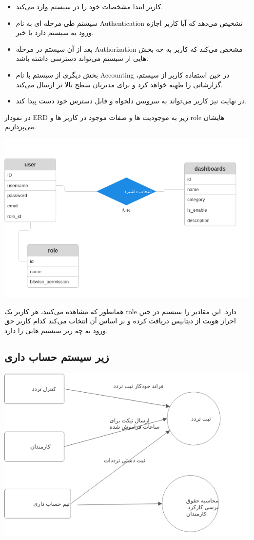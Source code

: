 \begin{itemize}
	\item کاربر ابتدا مشخصات خود را در سیستم وارد می‌کند.
	\item سیستم طی مرحله ای به نام Authentication تشخیص می‌دهد که آیا کاربر اجازه ورود به سیستم دارد یا خیر.
	\item بعد از آن سیستم در مرحله Authorization مشخص می‌کند که کاربر به چه بخش هایی از سیستم می‌تواند دسترسی داشته باشد.
	\item بخش دیگری از سیستم با نام Accounting در حین استفاده کاربر از سیستم، گزارشاتی را طهیه خواهد کرد و برای مدیریان سطح بالا تر ارسال می‌کند.
	\item در نهایت نیز کاربر می‌تواند به سرویس دلخواه و قابل دسترس خود دست پیدا کند.
\end{itemize}

در نمودار ERD زیر به موجودیت ها و صفات موجود در کاربر ها و role هایشان می‌پردازیم.

\includegraphics[scale=0.8]{assets/auth_erd.png}

همانطور که مشاهده می‌کنید، هر کاربر یک role دارد. این مقادیر را سیستم در حین احراز هویت از دیتابیس دریافت کرده و بر اساس آن انتخاب می‌کند
کدام کاربر حق ورود به چه زیر سیستم هایی را دارد.

\subsection{زیر سیستم حساب داری}

\includegraphics[scale=0.8]{assets/finance_dfd.png}

